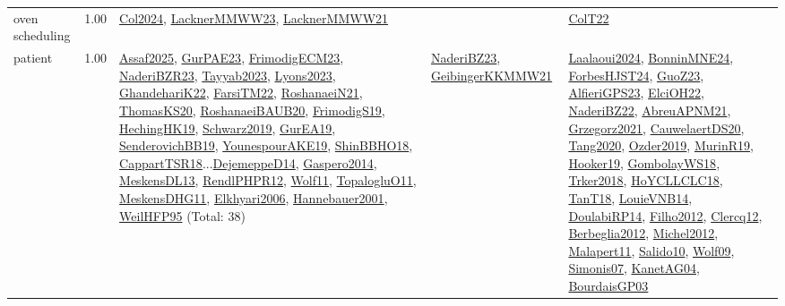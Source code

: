 {\begin{longtable}{p{3cm}r>{\raggedright\arraybackslash}p{6cm}>{\raggedright\arraybackslash}p{6cm}>{\raggedright\arraybackslash}p{8cm}}
\index{oven scheduling}\index{ApplicationAreas!oven scheduling}oven scheduling &  1.00 & \hyperref[detail:Col2024]{Col2024}, \hyperref[detail:LacknerMMWW23]{LacknerMMWW23}, \hyperref[detail:LacknerMMWW21]{LacknerMMWW21} &  & \hyperref[detail:ColT22]{ColT22}\\
\index{patient}\index{ApplicationAreas!patient}patient &  1.00 & \hyperref[detail:Assaf2025]{Assaf2025}, \hyperref[detail:GurPAE23]{GurPAE23}, \hyperref[detail:FrimodigECM23]{FrimodigECM23}, \hyperref[detail:NaderiBZR23]{NaderiBZR23}, \hyperref[detail:Tayyab2023]{Tayyab2023}, \hyperref[detail:Lyons2023]{Lyons2023}, \hyperref[detail:GhandehariK22]{GhandehariK22}, \hyperref[detail:FarsiTM22]{FarsiTM22}, \hyperref[detail:RoshanaeiN21]{RoshanaeiN21}, \hyperref[detail:ThomasKS20]{ThomasKS20}, \hyperref[detail:RoshanaeiBAUB20]{RoshanaeiBAUB20}, \hyperref[detail:FrimodigS19]{FrimodigS19}, \hyperref[detail:HechingHK19]{HechingHK19}, \hyperref[detail:Schwarz2019]{Schwarz2019}, \hyperref[detail:GurEA19]{GurEA19}, \hyperref[detail:SenderovichBB19]{SenderovichBB19}, \hyperref[detail:YounespourAKE19]{YounespourAKE19}, \hyperref[detail:ShinBBHO18]{ShinBBHO18}, \hyperref[detail:CappartTSR18]{CappartTSR18}...\hyperref[detail:DejemeppeD14]{DejemeppeD14}, \hyperref[detail:Gaspero2014]{Gaspero2014}, \hyperref[detail:MeskensDL13]{MeskensDL13}, \hyperref[detail:RendlPHPR12]{RendlPHPR12}, \hyperref[detail:Wolf11]{Wolf11}, \hyperref[detail:TopalogluO11]{TopalogluO11}, \hyperref[detail:MeskensDHG11]{MeskensDHG11}, \hyperref[detail:Elkhyari2006]{Elkhyari2006}, \hyperref[detail:Hannebauer2001]{Hannebauer2001}, \hyperref[detail:WeilHFP95]{WeilHFP95} (Total: 38) & \hyperref[detail:NaderiBZ23]{NaderiBZ23}, \hyperref[detail:GeibingerKKMMW21]{GeibingerKKMMW21} & \hyperref[detail:Laalaoui2024]{Laalaoui2024}, \hyperref[detail:BonninMNE24]{BonninMNE24}, \hyperref[detail:ForbesHJST24]{ForbesHJST24}, \hyperref[detail:GuoZ23]{GuoZ23}, \hyperref[detail:AlfieriGPS23]{AlfieriGPS23}, \hyperref[detail:ElciOH22]{ElciOH22}, \hyperref[detail:NaderiBZ22]{NaderiBZ22}, \hyperref[detail:AbreuAPNM21]{AbreuAPNM21}, \hyperref[detail:Grzegorz2021]{Grzegorz2021}, \hyperref[detail:CauwelaertDS20]{CauwelaertDS20}, \hyperref[detail:Tang2020]{Tang2020}, \hyperref[detail:Ozder2019]{Ozder2019}, \hyperref[detail:MurinR19]{MurinR19}, \hyperref[detail:Hooker19]{Hooker19}, \hyperref[detail:GombolayWS18]{GombolayWS18}, \hyperref[detail:Trker2018]{Trker2018}, \hyperref[detail:HoYCLLCLC18]{HoYCLLCLC18}, \hyperref[detail:TanT18]{TanT18}, \hyperref[detail:LouieVNB14]{LouieVNB14}, \hyperref[detail:DoulabiRP14]{DoulabiRP14}, \hyperref[detail:Filho2012]{Filho2012}, \hyperref[detail:Clercq12]{Clercq12}, \hyperref[detail:Berbeglia2012]{Berbeglia2012}, \hyperref[detail:Michel2012]{Michel2012}, \hyperref[detail:Malapert11]{Malapert11}, \hyperref[detail:Salido10]{Salido10}, \hyperref[detail:Wolf09]{Wolf09}, \hyperref[detail:Simonis07]{Simonis07}, \hyperref[detail:KanetAG04]{KanetAG04}, \hyperref[detail:BourdaisGP03]{BourdaisGP03}\\

\end{longtable}}
